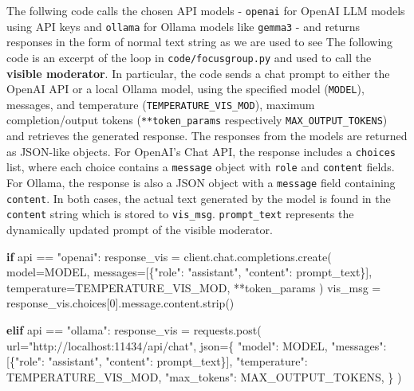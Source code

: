 \documentclass[
  letterpaper,
  DIV=11,
  numbers=noendperiod]{scrartcl}
\newenvironment{Shaded}{\begin{snugshade}}{\end{snugshade}}
\newcommand{\ControlFlowTok}[1]{\textcolor[rgb]{0.00,0.23,0.31}{\textbf{#1}}}
\newcommand{\DecValTok}[1]{\textcolor[rgb]{0.68,0.00,0.00}{#1}}
\newcommand{\NormalTok}[1]{\textcolor[rgb]{0.00,0.23,0.31}{#1}}
\newcommand{\OperatorTok}[1]{\textcolor[rgb]{0.37,0.37,0.37}{#1}}
\newcommand{\StringTok}[1]{\textcolor[rgb]{0.13,0.47,0.30}{#1}}
\begin{document}
The follwing code calls the chosen API models - \texttt{openai} for
OpenAI LLM models using API keys and \texttt{ollama} for Ollama models
like \texttt{gemma3} - and returns responses in the form of normal text
string as we are used to see The following code is an excerpt of the
loop in \texttt{code/focusgroup.py} and used to call the \textbf{visible
moderator}. In particular, the code sends a chat prompt to either the
OpenAI API or a local Ollama model, using the specified model
(\texttt{MODEL}), messages, and temperature
(\texttt{TEMPERATURE\_VIS\_MOD}), maximum completion/output tokens
(\texttt{**token\_params} respectively \texttt{MAX\_OUTPUT\_TOKENS}) and
retrieves the generated response. The responses from the models are
returned as JSON-like objects. For OpenAI's Chat API, the response
includes a \texttt{choices} list, where each choice contains a
\texttt{message} object with \texttt{role} and \texttt{content} fields.
For Ollama, the response is also a JSON object with a \texttt{message}
field containing \texttt{content}. In both cases, the actual text
generated by the model is found in the \texttt{content} string which is
stored to \texttt{vis\_msg}. \texttt{prompt\_text} represents the
dynamically updated prompt of the visible moderator.

\begin{Shaded}
\begin{Highlighting}[]
            \ControlFlowTok{if}\NormalTok{ api }\OperatorTok{==} \StringTok{"openai"}\NormalTok{:}
\NormalTok{                response\_vis }\OperatorTok{=}\NormalTok{ client.chat.completions.create(}
\NormalTok{                    model}\OperatorTok{=}\NormalTok{MODEL,}
\NormalTok{                    messages}\OperatorTok{=}\NormalTok{[\{}\StringTok{"role"}\NormalTok{: }\StringTok{"assistant"}\NormalTok{, }\StringTok{"content"}\NormalTok{: prompt\_text\}],}
\NormalTok{                    temperature}\OperatorTok{=}\NormalTok{TEMPERATURE\_VIS\_MOD,}
                    \OperatorTok{**}\NormalTok{token\_params}
\NormalTok{                )}
\NormalTok{                vis\_msg }\OperatorTok{=}\NormalTok{ response\_vis.choices[}\DecValTok{0}\NormalTok{].message.content.strip()}

            \ControlFlowTok{elif}\NormalTok{ api }\OperatorTok{==} \StringTok{"ollama"}\NormalTok{:}
\NormalTok{                response\_vis }\OperatorTok{=}\NormalTok{ requests.post(}
\NormalTok{                    url}\OperatorTok{=}\StringTok{"http://localhost:11434/api/chat"}\NormalTok{,}
\NormalTok{                    json}\OperatorTok{=}\NormalTok{\{}
                        \StringTok{"model"}\NormalTok{: MODEL,}
                        \StringTok{"messages"}\NormalTok{: [\{}\StringTok{"role"}\NormalTok{: }\StringTok{"assistant"}\NormalTok{, }\StringTok{"content"}\NormalTok{: prompt\_text\}],}
                        \StringTok{"temperature"}\NormalTok{: TEMPERATURE\_VIS\_MOD,}
                        \StringTok{"max\_tokens"}\NormalTok{: MAX\_OUTPUT\_TOKENS,}
\NormalTok{                    \}}
\NormalTok{                )}
\end{Highlighting}
\end{Shaded}
\end{document}
